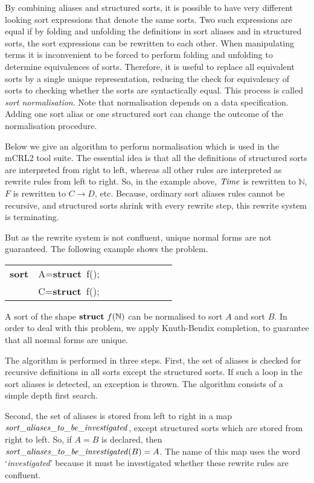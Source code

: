 \documentclass{article}
\makeatletter
\newcommand{\Nat}{\mathbb{N}}
\newenvironment{mcrl2}%
{\begin{trivlist}
\item\begin{tabular}{@{}>{\bf}p{2.3em}L@{\ }L@{\ }L@{\ }L@{\ }L@{\ }L@{\ }L@{\ }L}}%
{\end{tabular}\end{trivlist}}
\makeatother
\begin{document}
By combining aliases and structured sorts, 
it is possible to have very different looking sort expressions that denote
the same sorts. Two such expressions are equal if by folding and unfolding the definitions in
sort aliases and in structured sorts, 
the sort expressions can be rewritten to each other. 
When manipulating terms it is inconvenient
to be forced to perform folding and unfolding to determine equivalences of sorts. Therefore, it
is useful to replace all equivalent sorts by a single unique representation, reducing the check
for equivalency of sorts to checking whether the sorts are syntactically equal. This process
is called {\it sort normalisation}. Note that normalisation depends on a data specification.
Adding one sort alias or one structured sort can change the outcome of the 
normalisation procedure. 

Below we give an algorithm to perform normalisation which is used in the mCRL2 tool suite.
The essential idea is that all 
the definitions of structured sorts are interpreted from right to left, whereas all other 
rules are interpreted as rewrite rules from left to right. So, in the example above,
${\it Time}$ is rewritten to $\Nat$, $F$ is rewritten to $C\rightarrow D$, etc. Because,
ordinary sort aliases rules cannot be recursive, and structured sorts shrink with every
rewrite step, this rewrite system is terminating.

But as the rewrite system is not confluent, unique normal forms are not guaranteed. 
The following example shows the problem.
\begin{mcrl2}
sort & A={\bf struct}~f(\Nat);\\
     & C={\bf struct}~f(\Nat);
\end{mcrl2}
A sort of the shape ${\bf struct}~f(\Nat)$ can be normalised to sort $A$ and sort $B$. 
In order to deal with this problem, we apply Knuth-Bendix completion, to guarantee that
all normal forms are unique.

The algorithm is performed in three steps.
First, the set of aliases is checked for recursive definitions
in all sorts except the structured sorts. If such a loop in the sort aliases is
detected, an exception is thrown. The algorithm consists of
a simple depth first search.
 
Second, the set of aliases is stored from 
left to right in a map $\it sort\_aliases\_to\_be\_investigated$, except structured
sorts which are stored from right to left.
So, if $A=B$ is declared, then ${\it sort\_aliases\_to\_be\_investigated}(B)=A$.
The name of this map uses the word `{\it investigated}' because it
must be investigated whether these rewrite rules are confluent.
\end{document}
